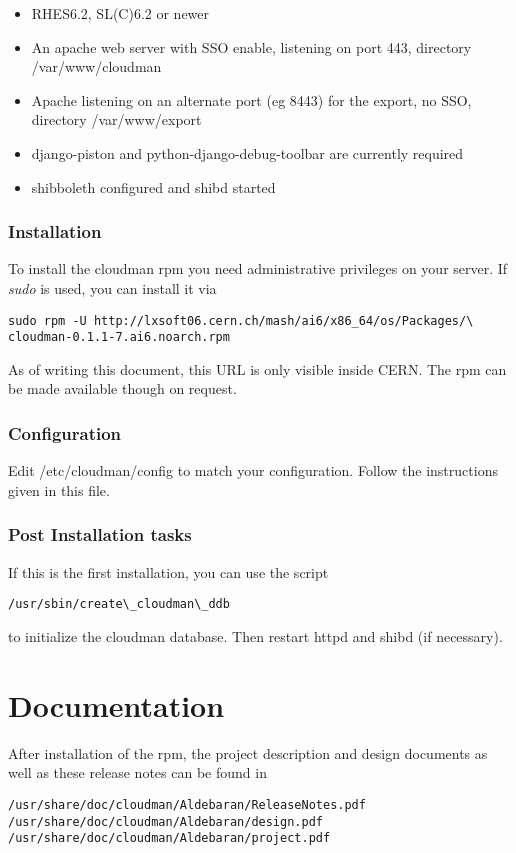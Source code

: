 \documentclass[12pt]{article}
\begin{document}
\begin{itemize}
 \item RHES6.2, SL(C)6.2 or newer 
 \item An apache web server with SSO enable, listening on port 443, directory /var/www/cloudman
 \item Apache listening on an alternate port (eg 8443) for the export, no SSO, directory /var/www/export
 \item django-piston and python-django-debug-toolbar are currently required
 \item shibboleth configured and shibd started
\end{itemize}

\subsubsection{Installation}
To install the cloudman rpm you need administrative privileges on your server. If {\it sudo} is used, you can install it
via
\begin{verbatim}
sudo rpm -U http://lxsoft06.cern.ch/mash/ai6/x86_64/os/Packages/\
cloudman-0.1.1-7.ai6.noarch.rpm
\end{verbatim}
As of writing this document, this URL is only visible inside CERN. The rpm can be made available though on request. 

\subsubsection{Configuration}

Edit /etc/cloudman/config to match your configuration. Follow the instructions 
given in this file. 

\subsubsection{Post Installation tasks}
If this is the first installation, you can use the script 
\begin{verbatim}
/usr/sbin/create\_cloudman\_ddb 
\end{verbatim}
to initialize the cloudman database. Then restart httpd and shibd (if necessary). 

\section{Documentation}
After installation of the rpm, the project description and design documents as well as these release notes can be found in 
\begin{verbatim}
/usr/share/doc/cloudman/Aldebaran/ReleaseNotes.pdf
/usr/share/doc/cloudman/Aldebaran/design.pdf
/usr/share/doc/cloudman/Aldebaran/project.pdf
\end{verbatim}
\end{document}
